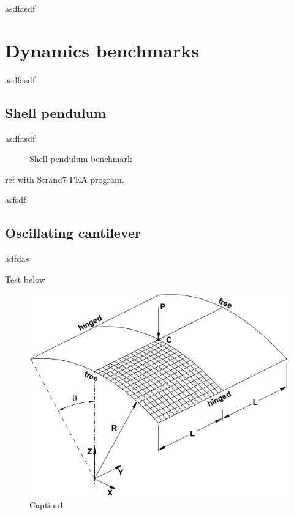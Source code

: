 \doublespacing

asdfasdf

\section{Dynamics benchmarks}

asdfasdf

\subsection{Shell pendulum}

asdfasdf

\singlespacing
\begin{figure}[H]
	\caption{\label{ref_label_overall}Shell pendulum benchmark}
\end{figure}

\doublespacing

ref with Strand7 FEA program.

asfsdf

\subsection{Oscillating cantilever}

adfdas

Test below

\begin{figure}
	\includegraphics[width=0.9\linewidth]
	{images/hinged_cylindrical_roof.png} 
	\caption{Caption1}
	\label{fig:subim1}
\end{figure}

